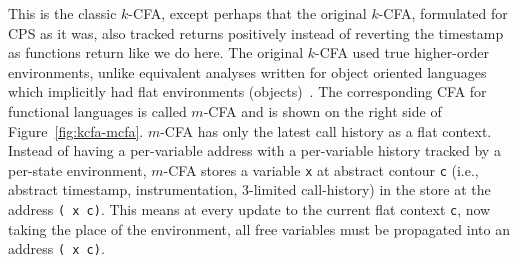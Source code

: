 This is the classic $k$-CFA, except perhaps that the original $k$-CFA, formulated for CPS as it was, also tracked returns positively instead of reverting the timestamp as functions return like we do here. The original $k$-CFA used true higher-order environments, unlike equivalent analyses written for object oriented languages which implicitly had flat environments (objects)~\cite{might2010resolving}. The corresponding CFA for functional languages is called $m$-CFA and is shown on the right side of Figure~\ref{fig:kcfa-mcfa}. $m$-CFA has only the latest call history as a flat context. Instead of having a per-variable address with a per-variable history tracked by a per-state environment, $m$-CFA stores a variable \texttt{x} at abstract contour \texttt{c} (i.e., abstract timestamp, instrumentation, 3-limited call-history) in the store at the address \texttt{( x c)}. This means at every update to the current flat context \texttt{c}, now taking the place of the environment, all free variables must be propagated into an address \texttt{( x c)}.








